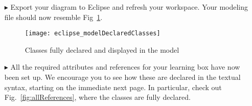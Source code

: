 \begin{itemize}
\vspace{1cm}

\item[$\blacktriangleright$] Export your diagram to Eclipse and refresh your workspace. Your modeling file should now resemble Fig~\ref{fig:model_allClasses}.

\vspace{1cm}

\begin{figure}[htbp]
	\centering
  \texttt{[image: eclipse\_modelDeclaredClasses]}
	\caption{Classes fully declared and displayed in the model}
	\label{fig:model_allClasses}
\end{figure}

\vspace{1cm}

\item[$\blacktriangleright$] All the required attributes and references for your learning box have now been set up. We encourage you to see how these are
declared in the textual syntax, starting on the immediate next page. In particular, check out Fig.~\ref{fig:allReferences}, where the classes are fully
declared.


\end{itemize}
